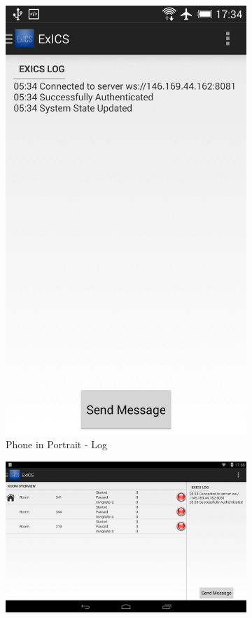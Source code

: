 \begin{figure}[h]
\begin{subfigure}[b]{0.35\textwidth}
		\includegraphics[width=\textwidth]{"screenshots/phone_portrait_activity_log"}
		\caption{Phone in Portrait - Log}
		\label{subfig:phone_portrait_log}
	\end{subfigure}
	\newline
	\begin{subfigure}[b]{0.9\textwidth}
		\includegraphics[width=\textwidth]{"screenshots/tablet_main_landscape"}

\end{subfigure}
\end{figure}
